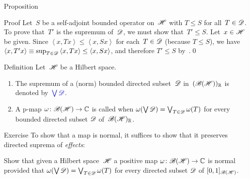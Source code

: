 \documentclass[a]{subfiles}
\begin{document}
\begin{parsec}
\begin{point}{Proposition}
\begin{point}{Proof}
Let~$S$ be a self-adjoint bounded operator on~$\mathscr{H}$ with $T\leq S$
for all~$T\in\mathscr{D}$.
To prove that~$T'$ is the supremum of~$\mathscr{D}$,
we must show that~$T'\leq S$.
Let~$x\in \mathscr{H}$ be given.
Since $\left<x,Tx\right>\leq \left<x,Sx\right>$
for each~$T\in \mathscr{D}$ (because $T\leq S$),
we have $\left<x,T'x\right>\equiv \sup_{T\in\mathscr{D}} \left<x,Tx\right>
\leq \left<x,Sx\right>$,
and therefore $T'\leq S$ by~\TODO{}.\qed
\end{point}
\end{point}
\begin{point}{Definition}%
Let~$\mathscr{H}$ be a Hilbert space.
\begin{enumerate}
\item
The supremum of a (norm) bounded directed subset~$\mathscr{D}$ 
in~$(\mathscr{B}(\mathscr{H}))_{\mathbb{R}}$
is denoted by~$\Define{\bigvee\scrD}$.
\item
A p-map $\omega\colon \mathscr{B}(\mathscr{H})\to\mathbb{C}$
is called  when
$\omega(\bigvee \mathscr{D})=\bigvee_{T\in\mathscr{D}} \omega(T)$
for every bounded directed subset $\mathscr{D}$ of~$\mathscr{B}(\mathscr{H})_{\mathbb{R}}$.
\end{enumerate}
\end{point}
\begin{point}{Exercise}%
To show that a map is normal, it suffices to show 
that it preserves directed suprema of \emph{effects}:

Show that given a Hilbert space~$\mathscr{H}$
a  positive map $\omega\colon \mathscr{B}(\mathscr{H})\to\mathbb{C}$
is normal 
provided that $\omega(\bigvee \mathscr{D}) = \bigvee_{T\in\mathscr{D}} \omega(T)$
for every directed subset $\mathscr{D}$ of $[0,1]_{\mathscr{B}(\mathscr{H})}$.
\end{point}
\end{parsec}
\end{document}
